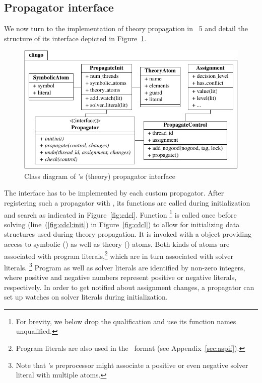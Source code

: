 \subsection{Propagator interface}
\label{sec:system}

We now turn to the implementation of theory propagation in \clingo~5
and detail the structure of its interface depicted in Figure~\ref{fig:interface}.
%
\begin{figure}
  \includegraphics[width=\textwidth]{figures/python-interface}
  \caption{Class diagram of \clingo's (theory) propagator interface\label{fig:interface}}
\end{figure}
%
The interface  has to be implemented by each custom propagator.
After registering such a propagator with \clingo,
its functions are called during initialization and search as indicated %
in Figure~\ref{fig:cdcl}.
%
Function %
\footnote{For brevity, we below drop the qualification  and use its function names unqualified.}
is called once before solving (line~(\ref{fig:cdcl:init}) in Figure~\ref{fig:cdcl})
to allow for initializing data structures used during theory propagation.
It is invoked with a  object providing access to symbolic () as well as theory () atoms.
Both kinds of atoms are associated with program literals,\footnote{Program literals are also used in the \aspif\ format (see Appendix~\ref{sec:aspif}).} %
which are in turn associated with solver literals.%
\footnote{Note that \clasp's preprocessor might associate a positive or even negative solver literal with multiple atoms.\label{fnt:solver:literals}}
Program as well as solver literals are identified by non-zero integers, where positive and negative numbers represent positive or  negative literals, respectively.
In order to get notified about assignment changes, a propagator can set up watches on solver literals during initialization.

